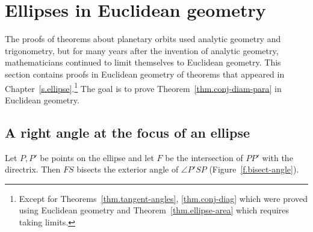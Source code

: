 
\chapter{Ellipses in Euclidean geometry}\label{s.geometry}

The proofs of theorems about planetary orbits used analytic geometry and trigonometry, but for many years after the invention of analytic geometry, mathematicians continued to limit themselves to Euclidean geometry. This section contains proofs in Euclidean geometry of theorems that appeared in Chapter~\ref{s.ellipse}.\footnote{Except for Theorems~\ref{thm.tangent-angles}, \ref{thm.conj-diag} which were proved using Euclidean geometry and Theorem~\ref{thm.ellipse-area} which requires taking limits.} The goal is to prove Theorem~\ref{thm.conj-diam-para} in Euclidean geometry.

\begin{center}
\end{center}


\section{A right angle at the focus of an ellipse}

\begin{theorem}\label{thm.bisect}
Let $P,P'$ be points on the ellipse and let $F$ be the intersection of $PP'$ with the directrix. Then $FS$ bisects the exterior angle of $\angle P'SP$ (Figure~\ref{f.bisect-angle}).
\end{theorem}


